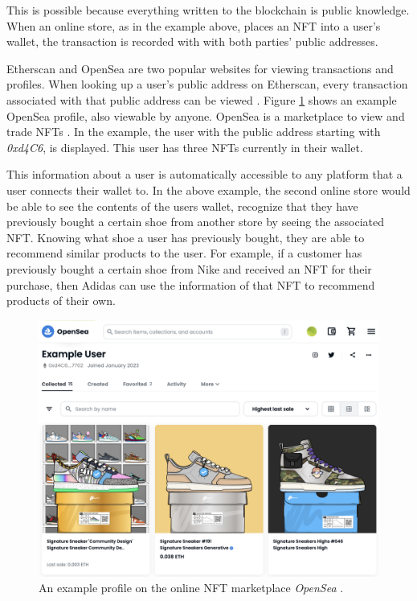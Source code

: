 This is possible because everything written to the blockchain is public knowledge. When an online store, as in the example above, places an NFT into a user's wallet, the transaction is recorded with with both parties' public addresses.

Etherscan \cite{etherscan} and OpenSea \cite{openSea} are two popular websites for viewing transactions and profiles. When looking up a user's public address on Etherscan, every transaction associated with that public address can be viewed \cite{etherscan}. Figure \ref{fig:openSea} shows an example OpenSea profile, also viewable by anyone. OpenSea is a marketplace to view and trade NFTs \cite{openSea}. In the example, the user with the public address starting with \textit{0xd4C6}, is displayed. This user has three NFTs currently in their wallet.

This information about a user is automatically accessible to any platform that a user connects their wallet to. In the above example, the second online store would be able to see the contents of the users wallet, recognize that they have previously bought a certain shoe from another store by seeing the associated NFT. Knowing what shoe a user has previously bought, they are able to recommend similar products to the user. For example, if a customer has previously bought a certain shoe from Nike and received an NFT for their purchase, then Adidas can use the information of that NFT to recommend products of their own.

\begin{figure}[t]
\includegraphics[width=\textwidth]{./gfx/openSea.png}
\centering
\caption{An example profile on the online NFT marketplace \textit{OpenSea} \cite{openSea}.}
\label{fig:openSea}
\end{figure}


